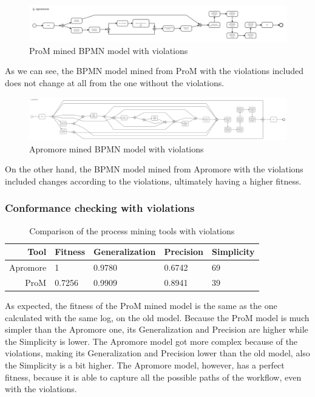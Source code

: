 \begin{figure}[H]
\centering
\includegraphics[width=\textwidth]{figures/prom_violations_mined.pdf}
\caption{ProM mined BPMN model with violations}
\label{fig:prom_violations_mined}
\end{figure}

As we can see, the BPMN model mined from ProM with the violations included
does not change at all from the one without the violations.

\begin{figure}[H]
\centering
\includegraphics[width=\textwidth]{figures/apromore_violations_mined.pdf}
\caption{Apromore mined BPMN model with violations}
\label{fig:apromore_violations_mined}
\end{figure}

On the other hand, the BPMN model mined from Apromore with the violations
included changes according to the violations, ultimately having a higher
fitness.

\subsubsection{Conformance checking with violations}

\begin{table}[H]
\centering
\begin{tabular}{|r|l|l|l|l|}
\hline
\textbf{Tool} & \textbf{Fitness} & \textbf{Generalization} & \textbf{Precision} & \textbf{Simplicity} \\
\hline
Apromore & 1 & 0.9780 & 0.6742 & 69 \\
\hline
ProM & 0.7256 & 0.9909 & 0.8941 & 39 \\
\hline
\end{tabular}
\caption{Comparison of the process mining tools with violations}
\label{tab:process_mining_comparison_violations}
\end{table}

As expected, the fitness of the ProM mined model is the same as the one calculated
with the same log, on the old model. Because the ProM model is much
simpler than the Apromore one, its Generalization and Precision are higher while
the Simplicity is lower. The Apromore model got more complex because of
the violations, making its Generalization and Precision lower than
the old model, also the Simplicity is a bit higher.
The Apromore model, however, has a perfect fitness, because it is able to
capture all the possible paths of the workflow, even with the violations.

